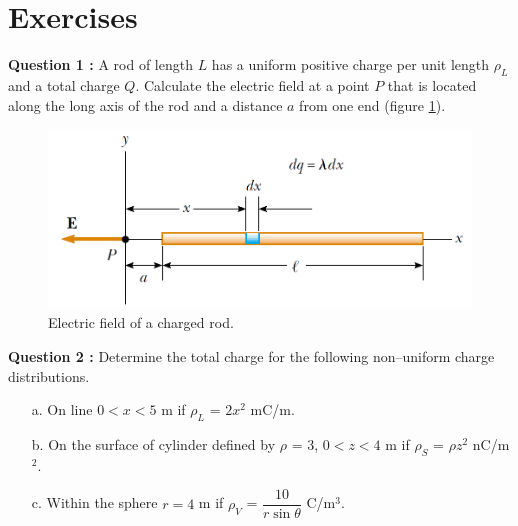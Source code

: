 \documentclass[12pt,a4paper]{article}
\begin{document}
\section{Exercises}
\noindent\textbf{Question 1 \cite[Example 23.7, page 721]{Serway}:} A rod of length $L$ has a uniform positive charge per unit length $\rho_L$ and a total charge $Q$. Calculate the electric field at a point $P$ that is located along the long axis of the rod and a distance $a$ from one end (figure \ref{electric-field-charged-rod}).
\begin{figure}[H]
\centering
\includegraphics[scale=0.45]{Figure23-17.png}
\caption{Electric field of a charged rod.}
\label{electric-field-charged-rod}
\end{figure}
\noindent\textbf{Question 2 \cite[Problem 4.5, page 155]{Sadiku}:} Determine the total charge for the following non--uniform charge distributions.
\begin{itemize}
\item[a.] On line $0 < x < 5$ m if $\rho_L$ = $2x^2$ mC/m.
\item[b.] On the surface of cylinder defined by $\rho$ = 3, $0 < z < 4$ m if $\rho_S$ = $\rho z^2$ nC/m$^2$.
\item[c.] Within the sphere $r = 4$ m if $\rho_V$ = $\dfrac{10}{r\sin\theta}$ C/m$^3$.
\end{itemize}


\end{document}
